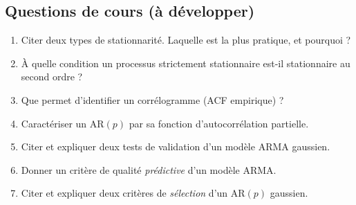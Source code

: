 \documentclass[11pt]{article}
\begin{document}
\subsection{Questions de cours (à développer)}
\begin{enumerate}[label=\textbf{Q\,A.\arabic*},leftmargin=*,start=15]
\item Citer deux types de stationnarité. Laquelle est la plus pratique, et pourquoi ?
\item À quelle condition un processus strictement stationnaire est-il stationnaire au second
ordre ?
\item Que permet d'identifier un corrélogramme (ACF empirique) ?
\item Caractériser un AR$(p)$ par sa fonction d'autocorrélation partielle.
\item Citer et expliquer deux tests de validation d'un modèle ARMA gaussien.
\item Donner un critère de qualité \emph{prédictive} d'un modèle ARMA.
\item Citer et expliquer deux critères de \emph{sélection} d'un AR$(p)$ gaussien.
\end{enumerate}

\end{document}
